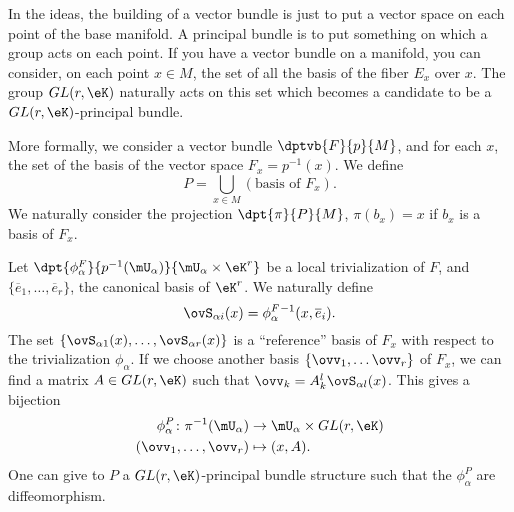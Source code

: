 In the ideas, the building of a vector bundle is just to put a vector space on each point of the base manifold. A principal bundle is to put something on which a group acts on each point. If you have a vector bundle on a manifold, you can consider, on each point $x\in M$, the set of all the basis of the fiber $E_x$ over $x$. The group $GL(r,\eK)$ naturally acts on this set which becomes a candidate to be a $GL(r,\eK)$-principal bundle.

More formally, we consider a vector bundle $\dptvb{F}{p}{M}$, and for each $x$, the set of the basis of the vector space $F_x=p^{-1}(x)$. We define
\[
	P=\bigcup_{x\in M}(\textrm{basis of $F_x$}).
\]
We naturally consider the projection $\dpt{\pi}{P}{M}$, $\pi(b_x)=x$ if $b_x$ is a basis of $F_x$.

Let $\dpt{\phi^F_{\alpha}}{p^{-1}(\mU_{\alpha})}{\mU_{\alpha}\times\eK^r}$ be a local trivialization of $F$, and $\{\overline{e}_1,\ldots,\overline{e}_r\}$, the canonical basis of $\eK^r$. We naturally define
\[
	\ovS_{\alpha i}(x)=\phi^F_{\alpha}{}^{-1}(x,\overline{e}_i).
\]
The set $\{\ovS_{\alpha 1}(x),\ldots,\ovS_{\alpha r}(x)\}$ is a ``reference''{} basis of $F_x$ with respect to the trivialization $\phi_{\alpha}$. If we choose another basis $\{\ovv_1,\ldots\ovv_r\}$ of $F_x$, we can find a matrix $A\in GL(r,\eK)$ such that $\ovv_k=A^l_k\ovS_{\alpha l}(x)$. This gives a bijection
\begin{equation}
	\begin{aligned}
		\phi_{\alpha}^P\colon \pi^{-1}(\mU_{\alpha}) & \to \mU_{\alpha}\times GL(r,\eK) \\
		(\ovv_1,\ldots,\ovv_r)                       & \mapsto (x,A).
	\end{aligned}
\end{equation}
One can give to $P$ a $GL(r,\eK)$-principal bundle structure such that the $\phi_{\alpha}^P$ are diffeomorphism.


